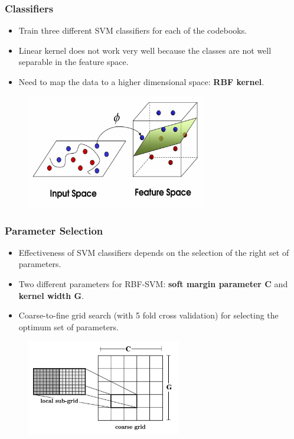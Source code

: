 \documentclass{beamer}
\begin{document}
\begin{frame}
\frametitle{Classifiers}
\begin{itemize}
\item<1-3> Train three different SVM classifiers for each of the codebooks.\\
\item<2-3> Linear kernel does not work very well because the classes are not well separable in the feature space.\\
\item<3> Need to map the data to a higher dimensional space: \textbf{RBF kernel}.\\
\end{itemize}
\begin{figure}
\includegraphics[width = 0.7\textwidth, height = 0.5\textheight]{svm}
\end{figure}
\end{frame}

\begin{frame}
\frametitle{Parameter Selection}
\begin{itemize}
\item<1-3> Effectiveness of SVM classifiers depends on the selection of the right set of parameters.
\item<2-3> Two different parameters for RBF-SVM: \textbf{soft margin parameter C} and \textbf{kernel width G}.
\item<3> Coarse-to-fine grid search (with 5 fold cross validation) for selecting the optimum set of parameters.
\end{itemize}
\begin{figure}
\includegraphics[width = 0.6\textwidth, height =0.4\textheight]{gridsearch}
\end{figure}
\end{frame}
\end{document}
